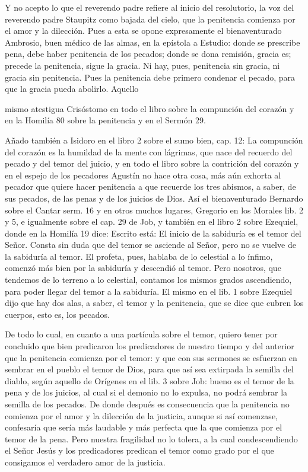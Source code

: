 Y no acepto lo que el reverendo padre refiere al inicio del resolutorio, la voz del reverendo padre Staupitz como bajada del cielo, que la penitencia comienza por el amor y la dilección. Pues a esta se opone expresamente el bienaventurado Ambrosio, buen médico de las almas, en la epístola a Estudio: donde se prescribe pena, debe haber penitencia de los pecados; donde se dona remisión, gracia es; precede la penitencia, sigue la gracia. Ni hay, pues, penitencia sin gracia, ni gracia sin penitencia. Pues la penitencia debe primero condenar el pecado, para que la gracia pueda abolirlo. Aquello

mismo atestigua Crisóstomo en todo el libro sobre la compunción del corazón y en la Homilía 80 sobre la penitencia y en el Sermón 29.

Añado también a Isidoro en el libro 2 sobre el sumo bien, cap. 12: La compunción del corazón es la humildad de la mente con lágrimas, que nace del recuerdo del pecado y del temor del juicio, y en todo el libro sobre la contrición del corazón y en el espejo de los pecadores Agustín no hace otra cosa, más aún exhorta al pecador que quiere hacer penitencia a que recuerde los tres abismos, a saber, de sus pecados, de las penas y de los juicios de Dios. Así el bienaventurado Bernardo sobre el Cantar serm. 16 y en otros muchos lugares, Gregorio en los Morales lib. 2 y 5, e igualmente sobre el cap. 29 de Job, y también en el libro 2 sobre Ezequiel, donde en la Homilía 19 dice: Escrito está: El inicio de la sabiduría es el temor del Señor. Consta sin duda que del temor se asciende al Señor, pero no se vuelve de la sabiduría al temor. El profeta, pues, hablaba de lo celestial a lo ínfimo, comenzó más bien por la sabiduría y descendió al temor. Pero nosotros, que tendemos de lo terreno a lo celestial, contamos los mismos \marginpar{\small[361]} grados ascendiendo, para poder llegar del temor a la sabiduría. El mismo en el lib. 1 sobre Ezequiel dijo que hay dos alas, a saber, el temor y la penitencia, que se dice que cubren los cuerpos, esto es, los pecados.

De todo lo cual, en cuanto a una partícula sobre el temor, quiero tener por concluido que bien predicaron los predicadores de nuestro tiempo y del anterior que la penitencia comienza por el temor: y que con sus sermones se esfuerzan en sembrar en el pueblo el temor de Dios, para que así sea extirpada la semilla del diablo, según aquello de Orígenes en el lib. 3 sobre Job: bueno es el temor de la pena y de los juicios, al cual si el demonio no lo expulsa, no podrá sembrar la semilla de los pecados. De donde después es consecuencia que la penitencia no comienza por el amor y la dilección de la justicia, aunque si así comenzase, confesaría que sería más laudable y más perfecta que la que comienza por el temor de la pena. Pero nuestra fragilidad no lo tolera, a la cual condescendiendo el Señor Jesús y los predicadores predican el temor como grado por el que consigamos el verdadero amor de la justicia.

